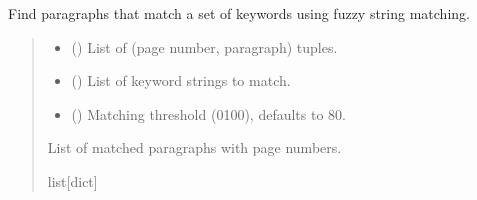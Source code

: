 \documentclass[letterpaper,10pt,english]{sphinxmanual}
\begin{document}
\begin{fulllineitems}
\label{\detokenize{modules.data_storage:modules.data_storage.paragraph_extraction.find_matching_paragraphs}}
\pysigstartsignatures
\pysiglinewithargsret
{}
{\sphinxparamcomma {}\sphinxparamcomma {}}
{}
\pysigstopsignatures
\sphinxAtStartPar
Find paragraphs that match a set of keywords using fuzzy string matching.
\begin{quote}\begin{description}
\begin{itemize}
\item {} 
\sphinxAtStartPar
{} (\sphinxstyleliteralemphasis{\sphinxupquote{{[}}}\sphinxstyleliteralemphasis{\sphinxupquote{{[}}}\sphinxstyleliteralemphasis{\sphinxupquote{, }}\sphinxstyleliteralemphasis{\sphinxupquote{{]}}}\sphinxstyleliteralemphasis{\sphinxupquote{{]}}}) \textendash{} List of (page number, paragraph) tuples.

\item {} 
\sphinxAtStartPar
{} (\sphinxstyleliteralemphasis{\sphinxupquote{{[}}}\sphinxstyleliteralemphasis{\sphinxupquote{{]}}}) \textendash{} List of keyword strings to match.

\item {} 
\sphinxAtStartPar
{} () \textendash{} Matching threshold (0\textendash{}100), defaults to 80.

\end{itemize}

\sphinxAtStartPar
List of matched paragraphs with page numbers.

\sphinxAtStartPar
list{[}dict{]}

\end{description}\end{quote}

\end{fulllineitems}
\end{document}
